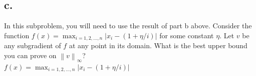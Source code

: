 \documentclass{article}
\newcommand{\1}{\mathbf{1}}
\newcommand{\norm}[1]{\left\|#1\right\|}
\begin{document}
{\begin{enumerate}
\end{enumerate}

\subsection*{c.}

In this subproblem, you will need to use the result of part b above. Consider the function $f(x) = \max_{i = 1, 2, \dots, n} |x_i - (1 + \eta/i)|$ for some constant $\eta$. Let $v$ be any subgradient of $f$ at any point in its domain. What is the best upper bound you can prove on $\norm{v}_{\infty}$? \\

$f(x) = \max_{i = 1, 2, \dots, n} |x_i - (1 + \eta/i)|$

}
\end{document}
